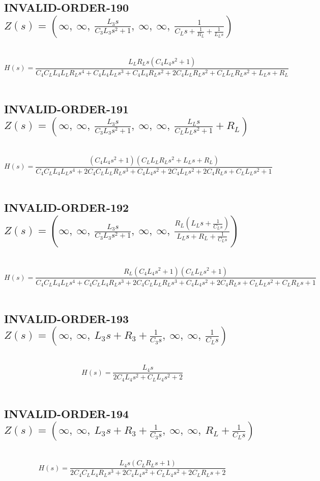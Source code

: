 \documentclass{article}
\begin{document}
\subsection{INVALID-ORDER-190 $Z(s) = \left( \infty, \  \infty, \  \frac{L_{3} s}{C_{3} L_{3} s^{2} + 1}, \  \infty, \  \infty, \  \frac{1}{C_{L} s + \frac{1}{R_{L}} + \frac{1}{L_{L} s}}\right)$ } \ 
\textbf{\[H(s) = \frac{L_{L} R_{L} s \left(C_{4} L_{4} s^{2} + 1\right)}{C_{4} C_{L} L_{4} L_{L} R_{L} s^{4} + C_{4} L_{4} L_{L} s^{3} + C_{4} L_{4} R_{L} s^{2} + 2 C_{4} L_{L} R_{L} s^{2} + C_{L} L_{L} R_{L} s^{2} + L_{L} s + R_{L}}\] } \ 
\subsection{INVALID-ORDER-191 $Z(s) = \left( \infty, \  \infty, \  \frac{L_{3} s}{C_{3} L_{3} s^{2} + 1}, \  \infty, \  \infty, \  \frac{L_{L} s}{C_{L} L_{L} s^{2} + 1} + R_{L}\right)$ } \ 
\textbf{\[H(s) = \frac{\left(C_{4} L_{4} s^{2} + 1\right) \left(C_{L} L_{L} R_{L} s^{2} + L_{L} s + R_{L}\right)}{C_{4} C_{L} L_{4} L_{L} s^{4} + 2 C_{4} C_{L} L_{L} R_{L} s^{3} + C_{4} L_{4} s^{2} + 2 C_{4} L_{L} s^{2} + 2 C_{4} R_{L} s + C_{L} L_{L} s^{2} + 1}\] } \ 
\subsection{INVALID-ORDER-192 $Z(s) = \left( \infty, \  \infty, \  \frac{L_{3} s}{C_{3} L_{3} s^{2} + 1}, \  \infty, \  \infty, \  \frac{R_{L} \left(L_{L} s + \frac{1}{C_{L} s}\right)}{L_{L} s + R_{L} + \frac{1}{C_{L} s}}\right)$ } \ 
\textbf{\[H(s) = \frac{R_{L} \left(C_{4} L_{4} s^{2} + 1\right) \left(C_{L} L_{L} s^{2} + 1\right)}{C_{4} C_{L} L_{4} L_{L} s^{4} + C_{4} C_{L} L_{4} R_{L} s^{3} + 2 C_{4} C_{L} L_{L} R_{L} s^{3} + C_{4} L_{4} s^{2} + 2 C_{4} R_{L} s + C_{L} L_{L} s^{2} + C_{L} R_{L} s + 1}\] } \ 
\subsection{INVALID-ORDER-193 $Z(s) = \left( \infty, \  \infty, \  L_{3} s + R_{3} + \frac{1}{C_{3} s}, \  \infty, \  \infty, \  \frac{1}{C_{L} s}\right)$ } \ 
\textbf{\[H(s) = \frac{L_{4} s}{2 C_{4} L_{4} s^{2} + C_{L} L_{4} s^{2} + 2}\] } \ 
\subsection{INVALID-ORDER-194 $Z(s) = \left( \infty, \  \infty, \  L_{3} s + R_{3} + \frac{1}{C_{3} s}, \  \infty, \  \infty, \  R_{L} + \frac{1}{C_{L} s}\right)$ } \ 
\textbf{\[H(s) = \frac{L_{4} s \left(C_{L} R_{L} s + 1\right)}{2 C_{4} C_{L} L_{4} R_{L} s^{3} + 2 C_{4} L_{4} s^{2} + C_{L} L_{4} s^{2} + 2 C_{L} R_{L} s + 2}\] } \ 
\end{document}
